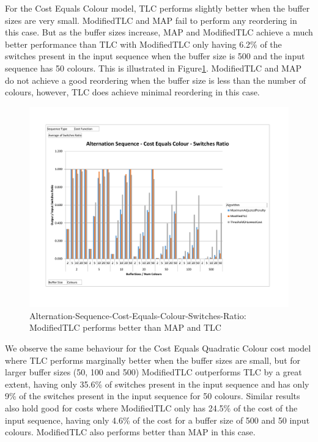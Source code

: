 For the Cost Equals Colour model, TLC performs slightly better when the buffer sizes are very small. ModifiedTLC and MAP fail to perform any reordering in this case. But as the buffer sizes increase, MAP and ModifiedTLC achieve a much better performance than TLC with ModifiedTLC only having 6.2\% of the switches present in the input sequence when the buffer size is 500 and the input sequence has 50 colours. This is illustrated in Figure\ref{AlternationSeqCostEqualsColourSwitches}. ModifiedTLC and MAP do not achieve a good reordering when the buffer size is less than the number of colours, however, TLC does achieve minimal reordering in this case. 

\begin{figure}[ht]
\centering 
\includegraphics[scale=0.60]{Alternation-Seq-Cost-Equals-Colour-Switches.pdf}
\caption{Alternation-Sequence-Cost-Equals-Colour-Switches-Ratio: ModifiedTLC performs better than MAP and TLC}
\label{AlternationSeqCostEqualsColourSwitches}
\end{figure}

We observe the same behaviour for the Cost Equals Quadratic Colour cost model where TLC performs marginally better when the buffer sizes are small, but for larger buffer sizes (50, 100 and 500) ModifiedTLC outperforms TLC by a great extent, having only 35.6\% of switches present in the input sequence and has only 9\% of the switches present in the input sequence for 50 colours. Similar results also hold good for costs where ModifiedTLC only has 24.5\% of the cost of the input sequence, having only 4.6\% of the cost for a buffer size of 500 and 50 input colours. ModifiedTLC also performs better than MAP in this case. 

